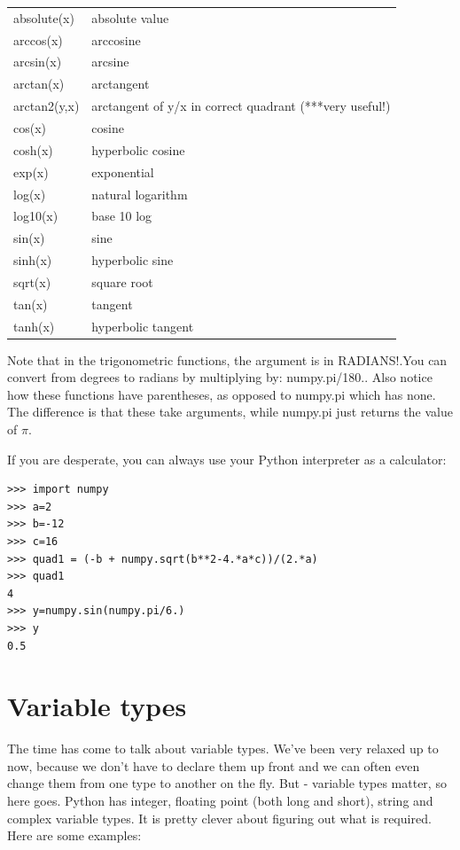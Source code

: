 \documentclass[11pt]{book}
\begin{document}
{\begin{tabular}{ll}
\hline
absolute(x)  \qquad & absolute value\\
arccos(x)    \qquad & arccosine\\
arcsin(x)    \qquad & arcsine\\
arctan(x)    \qquad & arctangent\\
arctan2(y,x)  \qquad &arctangent of y/x in correct quadrant (***very useful!)\\
cos(x)        \qquad &cosine\\
cosh(x)      \qquad & hyperbolic cosine\\
exp(x)      \qquad &  exponential\\
log(x)      \qquad &  natural logarithm\\
log10(x)    \qquad &  base 10 log\\
sin(x)       \qquad & sine\\
sinh(x)     \qquad &  hyperbolic sine\\
sqrt(x)    \qquad &   square root\\
tan(x)      \qquad &  tangent\\
tanh(x)    \qquad &   hyperbolic tangent\\
\hline
\end{tabular}

\noindent
Note that  in the trigonometric functions,  the argument is in RADIANS!.You can convert from degrees to radians by multiplying by:  {\color{blue}numpy.pi/180.}.  Also notice how these functions have parentheses, as opposed to {\color{blue}numpy.pi} which has none.  The difference is that these take arguments, while  {\color{blue}numpy.pi} just returns the value of $\pi$.


\noindent
If you are desperate, you can always use your Python interpreter as a calculator:

{ \color{blue} \begin{verbatim}
>>> import numpy
>>> a=2
>>> b=-12
>>> c=16
>>> quad1 = (-b + numpy.sqrt(b**2-4.*a*c))/(2.*a)
>>> quad1
4
>>> y=numpy.sin(numpy.pi/6.)
>>> y
0.5
\end{verbatim}}


\section{Variable types}

The time has come to talk about variable types.  We've been very relaxed up to now, because we don't have to declare them up front and we can often even change them from one type to another on the fly.  But - variable types matter, so here goes. Python has integer, floating point (both long and short), string and complex variable types.  It is pretty clever about figuring out what is required.   Here are some examples:

}
\end{document}

